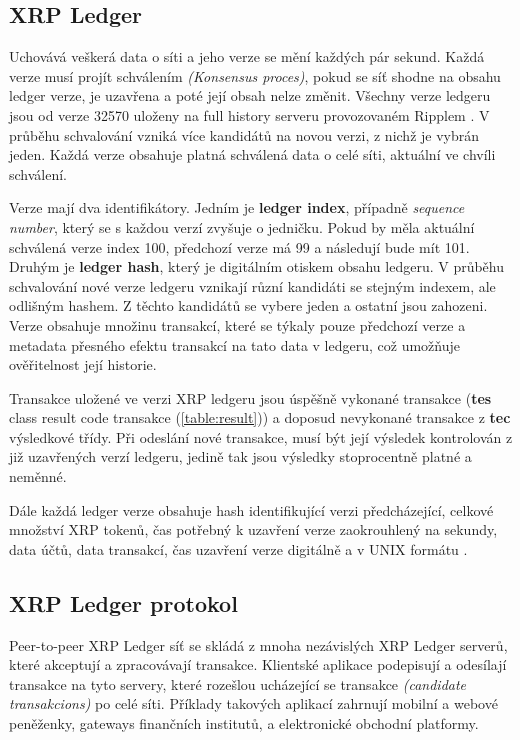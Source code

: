 \documentclass[hidelinks, titlepage]{article}
\begin{document}
\subsection{XRP Ledger}
Uchovává veškerá data o síti a jeho verze se mění každých pár sekund. Každá verze musí projít schválením \textit{(Konsensus proces)}, pokud se síť shodne na obsahu ledger verze, je uzavřena a poté její obsah nelze změnit. Všechny verze ledgeru jsou od verze 32570 uloženy na full history serveru provozovaném Ripplem \cite{history}. V průběhu schvalování vzniká více kandidátů na novou verzi, z nichž je vybrán jeden. Každá verze obsahuje platná schválená data o celé síti, aktuální ve chvíli schválení.

Verze mají dva identifikátory. Jedním je \textbf{ledger index}, případně \textit{sequence number}, který se s každou verzí zvyšuje o jedničku. Pokud by měla aktuální schválená verze index 100, předchozí verze má 99 a následují bude mít 101. Druhým je \textbf{ledger hash}, který je digitálním otiskem obsahu ledgeru. V průběhu schvalování nové verze ledgeru vznikají různí kandidáti se stejným indexem, ale odlišným hashem. Z těchto kandidátů se vybere jeden a ostatní jsou zahozeni. Verze obsahuje množinu transakcí, které se týkaly pouze předchozí verze a metadata přesného efektu transakcí na tato data v ledgeru, což umožňuje ověřitelnost její historie.

Transakce uložené ve verzi XRP ledgeru jsou úspěšně vykonané transakce (\textbf{tes} class result code transakce (\ref{table:result})) a doposud nevykonané transakce z \textbf{tec} výsledkové třídy. Při odeslání nové transakce, musí být její výsledek kontrolován z již uzavřených verzí ledgeru, jedině tak jsou výsledky stoprocentně platné a neměnné.

Dále každá ledger verze obsahuje hash identifikující verzi předcházející, celkové množství XRP tokenů, čas potřebný k uzavření verze zaokrouhlený na sekundy, data účtů, data transakcí, čas uzavření verze digitálně a v UNIX formátu \cite{history}.

\subsection{XRP Ledger protokol}
Peer-to-peer XRP Ledger síť se skládá z mnoha nezávislých XRP Ledger serverů, které akceptují a zpracovávají transakce. Klientské aplikace podepisují a odesílají transakce na tyto servery, které rozešlou ucházející se transakce \textit{(candidate transakcions)} po celé síti. Příklady takových aplikací zahrnují mobilní a webové peněženky, gateways finančních institutů, a elektronické obchodní platformy.
\end{document}
